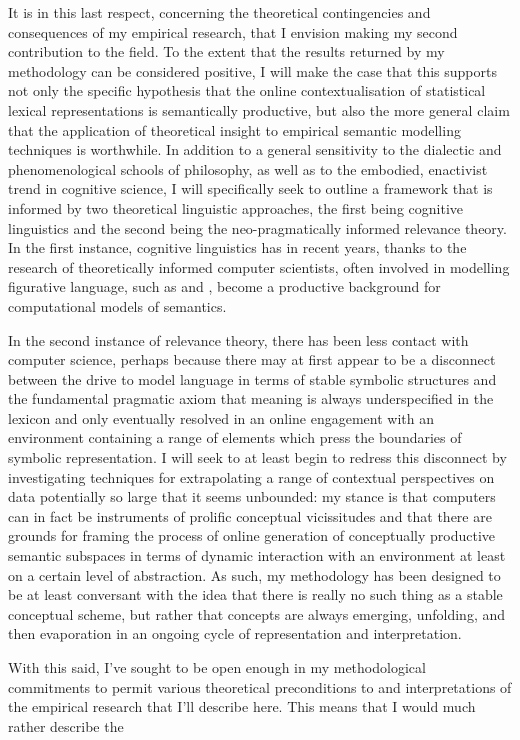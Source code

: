 It is in this last respect, concerning the theoretical contingencies and consequences of my empirical research, that I envision making my second contribution to the field.  To the extent that the results returned by my methodology can be considered positive, I will make the case that this supports not only the specific hypothesis that the online contextualisation of statistical lexical representations is semantically productive, but also the more general claim that the application of theoretical insight to empirical semantic modelling techniques is worthwhile.  In addition to a general sensitivity to the dialectic and phenomenological schools of philosophy, as well as to the embodied, enactivist trend in cognitive science, I will specifically seek to outline a framework that is informed by two theoretical linguistic approaches, the first being cognitive linguistics and the second being the neo-pragmatically informed relevance theory.  In the first instance, cognitive linguistics has in recent years, thanks to the research of theoretically informed computer scientists, often involved in modelling figurative language, such as \cite{Shutova} and \cite{Barnden}, become a productive background for computational models of semantics.

In the second instance of relevance theory, there has been less contact with computer science, perhaps because there may at first appear to be a disconnect between the drive to model language in terms of stable symbolic structures and the fundamental pragmatic axiom that meaning is always underspecified in the lexicon and only eventually resolved in an online engagement with an environment containing a range of elements which press the boundaries of symbolic representation.  I will seek to at least begin to redress this disconnect by investigating techniques for extrapolating a range of contextual perspectives on data potentially so large that it seems unbounded: my stance is that computers can in fact be instruments of prolific conceptual vicissitudes and that there are grounds for framing the process of online generation of conceptually productive semantic subspaces in terms of dynamic interaction with an environment at least on a certain level of abstraction.  As such, my methodology has been designed to be at least conversant with the idea that there is really no such thing as a stable conceptual scheme, but rather that concepts are always emerging, unfolding, and then evaporation in an ongoing cycle of representation and interpretation.

With this said, I've sought to be open enough in my methodological commitments to permit various theoretical preconditions to and interpretations of the empirical research that I'll describe here.  This means that I would much rather describe the

